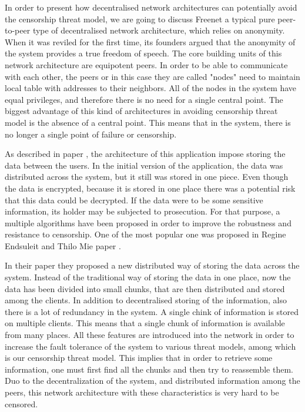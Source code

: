 In order to present how decentralised network architectures can potentially avoid the censorship threat model, we are going to discuss Freenet \cite{clarke2001} a typical pure peer-to-peer \cite{web:peertopeer} type of decentralised network architecture, which relies on anonymity. When it was reviled for the first time, its founders argued that the anonymity of the system provides a true freedom of speech. The core building units of this network architecture are equipotent peers. In order to be able to communicate with each other, the peers or in this case they are called "nodes" need to maintain local table with addresses to their neighbors. All of the nodes in the system have equal privileges, and therefore there is no need for a single central point. The biggest advantage of this kind of architectures in avoiding censorship threat model is the absence of a central point. This means that in the system, there is no longer a single point of failure or censorship.  

As described in paper \cite{clarke2001}, the architecture of this application impose storing the data between the users. In the initial version of the application, the data was distributed across the system, but it still was stored in one piece. Even though the data is encrypted, because it is stored in one place there was a potential risk that this data could be decrypted. If the data were to be some sensitive information, its holder may be subjected to prosecution. For that purpose, a multiple algorithms have been proposed in order to improve the robustness and resistance to censorship. One of the most popular one was proposed in Regine Endsuleit and Thilo Mie paper \cite{endsuleit2006}. 

In their paper they proposed a new distributed way of storing the data across the system. Instead of the traditional way of storing the data in one place, now the data has been divided into small chunks, that are then distributed and stored among the clients. In addition to decentralised storing of the information, also there is a lot of redundancy in the system. A single chink of information is stored on multiple clients. This means that a single chunk of information is available from many places. All these features are introduced into the network in order to increase the fault tolerance of the system to various threat models, among which is our censorship threat model. This implies that in order to retrieve some information, one must first find all the chunks and then try to reassemble them. Duo to the decentralization of the system, and distributed information among the peers, this network architecture with these characteristics is very hard to be censored.
